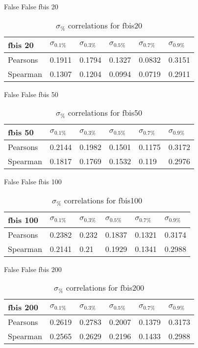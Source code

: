 \documentclass{sig-alternate}
\begin{document}
False False fbis 20
\begin{table}[h!]
\centering
\caption{$\sigma_{\%}$ correlations for fbis20}
\begin{tabular}{|l|l|l|l|l|l|}
\hline
fbis 20 & $\sigma_{0.1\%}$ & $\sigma_{0.3\%}$ & $\sigma_{0.5\%}$ & $\sigma_{0.7\%}$ & $\sigma_{0.9\%}$ \\ \hline
Pearsons  & 0.1911 & 0.1794 & 0.1327 & 0.0832 & 0.3151 \\ \hline
Spearman  & 0.1307 & 0.1204 & 0.0994 & 0.0719 & 0.2911 \\ \hline
\end{tabular}
\end{table}
False False fbis 50
\begin{table}[h!]
\centering
\caption{$\sigma_{\%}$ correlations for fbis50}
\begin{tabular}{|l|l|l|l|l|l|}
\hline
fbis 50 & $\sigma_{0.1\%}$ & $\sigma_{0.3\%}$ & $\sigma_{0.5\%}$ & $\sigma_{0.7\%}$ & $\sigma_{0.9\%}$ \\ \hline
Pearsons  & 0.2144 & 0.1982 & 0.1501 & 0.1175 & 0.3172 \\ \hline
Spearman  & 0.1817 & 0.1769 & 0.1532 & 0.119 & 0.2976 \\ \hline
\end{tabular}
\end{table}
False False fbis 100
\begin{table}[h!]
\centering
\caption{$\sigma_{\%}$ correlations for fbis100}
\begin{tabular}{|l|l|l|l|l|l|}
\hline
fbis 100 & $\sigma_{0.1\%}$ & $\sigma_{0.3\%}$ & $\sigma_{0.5\%}$ & $\sigma_{0.7\%}$ & $\sigma_{0.9\%}$ \\ \hline
Pearsons  & 0.2382 & 0.232 & 0.1837 & 0.1321 & 0.3174 \\ \hline
Spearman  & 0.2141 & 0.21 & 0.1929 & 0.1341 & 0.2988 \\ \hline
\end{tabular}
\end{table}
False False fbis 200
\begin{table}[h!]
\centering
\caption{$\sigma_{\%}$ correlations for fbis200}
\begin{tabular}{|l|l|l|l|l|l|}
\hline
fbis 200 & $\sigma_{0.1\%}$ & $\sigma_{0.3\%}$ & $\sigma_{0.5\%}$ & $\sigma_{0.7\%}$ & $\sigma_{0.9\%}$ \\ \hline
Pearsons  & 0.2619 & 0.2783 & 0.2007 & 0.1379 & 0.3173 \\ \hline
Spearman  & 0.2565 & 0.2629 & 0.2196 & 0.1433 & 0.2988 \\ \hline
\end{tabular}
\end{table}
\end{document}
